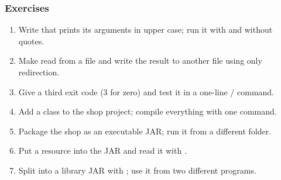 \documentclass[aspectratio=169,10pt,compress]{beamer}
\begin{document}
\begin{frame}[t,fragile] \frametitle{Exercises}
  \begin{enumerate}\small
    \item Write  that prints its arguments in upper case; run it with and without quotes.
    \item Make  read from a file and write the result to another file using only redirection.
    \item Give  a third exit code (3 for zero) and test it in a one-line \hCode{\&\&}/\hCode{||} command.
    \item Add a class  to the shop project; compile everything with one  command.
    \item Package the shop as an executable JAR; run it from a different folder.
    \item Put a  resource into the JAR and read it with .
    \item Split  into a library JAR with ; use it from two different programs.
  \end{enumerate}
\end{frame}




\begin{frame}[t,fragile]
	\begin{center}
		\vspace{4cm}
	\end{center}
\end{frame}
\end{document}
